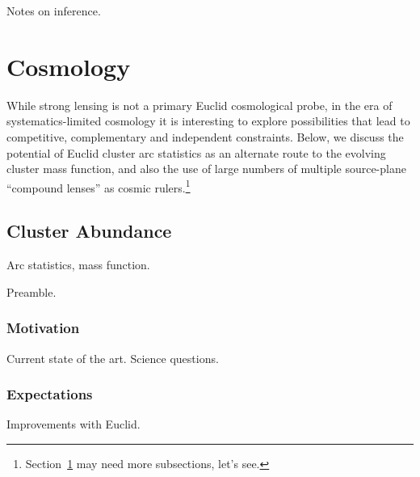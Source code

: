 \documentclass[twocolumn]{svjour3}
\begin{document}
Notes on inference.\\



%
%

\section{Cosmology}
\label{sec:cosmology}



While strong lensing is not a primary Euclid cosmological probe, in the
era of systematics-limited cosmology it is interesting to explore
possibilities that lead to competitive, complementary and independent
constraints. Below, we discuss the potential of Euclid cluster arc
statistics as an alternate route to the evolving cluster mass function,
and also the use of large numbers of multiple source-plane ``compound
lenses'' as cosmic rulers.\footnote{Section~\ref{sec:cosmology} may need
more subsections, let's see.}


\subsection{Cluster Abundance}



Arc statistics, mass function.

Preamble.

\subsubsection{Motivation}
Current state of the art. Science questions.\\

\subsubsection{Expectations}
Improvements with Euclid.\\
\end{document}
